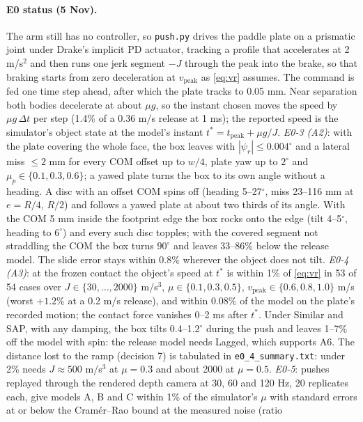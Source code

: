 \documentclass[10pt]{article}
\newcommand{\code}[1]{\texttt{#1}}
\begin{document}
\paragraph{E0 status (5 Nov).}  The arm still has no controller, so \code{push.py} drives the paddle plate on a prismatic
joint under Drake's implicit PD actuator, tracking a profile that accelerates at 2 m/s$^2$ and then runs one jerk segment $-J$
through the peak into the brake, so that braking starts from zero deceleration at $v_{\mathrm{peak}}$ as \eqref{eq:vr} assumes.
The command is fed one time step ahead, after which the plate tracks to 0.05 mm.  Near separation both bodies decelerate at
about $\mu g$, so the instant chosen moves the speed by $\mu g\,\Delta t$ per step (1.4\% of a 0.36 m/s release at 1 ms); the
reported speed is the simulator's object state at the model's instant $t^* = t_{\mathrm{peak}} + \mu g/J$.
\emph{E0-3 (A2)}: with the plate covering the whole face, the box leaves with $|\psi_r| \le 0.004^\circ$ and a lateral miss
$\le 2$ mm for every COM offset up to $w/4$, plate yaw up to $2^\circ$ and $\mu_p \in \{0.1, 0.3, 0.6\}$; a yawed plate turns the box
to its own angle without a heading.  A disc with an offset COM spins off (heading 5--27$^\circ$, miss 23--116 mm at $e = R/4$, $R/2$)
and follows a yawed plate at about two thirds of its angle.  With the COM 5 mm inside the footprint edge the box rocks onto the edge
(tilt 4--5$^\circ$, heading to $6^\circ$) and every such disc topples; with the covered segment not straddling the COM the box
turns $90^\circ$ and leaves 33--86\% below the release model.  The slide error stays within 0.8\% wherever the object does not tilt.
\emph{E0-4 (A3)}: at the frozen contact the object's speed at $t^*$ is within 1\% of \eqref{eq:vr} in 53 of 54 cases over
$J \in \{30, \dots, 2000\}$ m/s$^3$, $\mu \in \{0.1, 0.3, 0.5\}$, $v_{\mathrm{peak}} \in \{0.6, 0.8, 1.0\}$ m/s (worst $+1.2\%$ at a
0.2 m/s release), and within 0.08\% of the model on the plate's recorded motion; the contact force vanishes 0--2 ms after $t^*$.
Under Similar and SAP, with any damping, the box tilts 0.4--1.2$^\circ$ during the push and leaves 1--7\% off the model with spin:
the release model needs Lagged, which supports A6.  The distance lost to the ramp (decision 7) is tabulated in
\code{e0\_4\_summary.txt}: under 2\% needs $J \approx 500$ m/s$^3$ at $\mu = 0.3$ and about 2000 at $\mu = 0.5$.
\emph{E0-5}: pushes replayed through the rendered depth camera at 30, 60 and 120 Hz, 20 replicates each, give models A, B and C
within 1\% of the simulator's $\mu$ with standard errors at or below the Cram\'er--Rao bound at the measured noise (ratio
\end{document}
